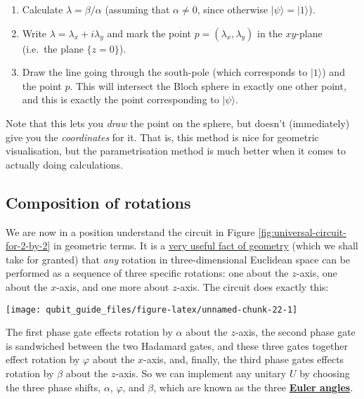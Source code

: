 \documentclass[fleqn]{article}
\providecommand{\tightlist}{%
  \setlength{\itemsep}{0pt}\setlength{\parskip}{0pt}}
\begin{document}
\begin{enumerate}
\def\labelenumi{\arabic{enumi}.}
\tightlist
\item
  Calculate \(\lambda=\beta/\alpha\) (assuming that \(\alpha\neq0\), since otherwise \(|\psi\rangle=|1\rangle\)).
\item
  Write \(\lambda=\lambda_x+i\lambda_y\) and mark the point \(p=(\lambda_x,\lambda_y)\) in the \(xy\)-plane (i.e.~the plane \(\{z=0\}\)).
\item
  Draw the line going through the south-pole (which corresponds to \(|1\rangle\)) and the point \(p\). This will intersect the Bloch sphere in exactly one other point, and this is exactly the point corresponding to \(|\psi\rangle\).
\end{enumerate}

Note that this lets you \emph{draw} the point on the sphere, but doesn't (immediately) give you the \emph{coordinates} for it.
That is, this method is nice for geometric visualisation, but the parametrisation method is much better when it comes to actually doing calculations.

\hypertarget{composition-of-rotations}{%
\subsection{Composition of rotations}\label{composition-of-rotations}}

We are now in a position understand the circuit in Figure \ref{fig:universal-circuit-for-2-by-2} in geometric terms.
It is a \href{https://en.wikipedia.org/wiki/Euler_angles\#Conventions_by_extrinsic_rotations}{very useful fact of geometry} (which we shall take for granted) that \emph{any} rotation in three-dimensional Euclidean space can be performed as a sequence of three specific rotations: one about the \(z\)-axis, one about the \(x\)-axis, and one more about \(z\)-axis.
The circuit does exactly this:

\begin{center}\texttt{[image: qubit\_guide\_files/figure-latex/unnamed-chunk-22-1]} \end{center}

The first phase gate effects rotation by \(\alpha\) about the \(z\)-axis, the second phase gate is sandwiched between the two Hadamard gates, and these three gates together effect rotation by \(\varphi\) about the \(x\)-axis, and, finally, the third phase gates effects rotation by \(\beta\) about the \(z\)-axis.
So we can implement any unitary \(U\) by choosing the three phase shifts, \(\alpha\), \(\varphi\), and \(\beta\), which are known as the three \href{https://en.wikipedia.org/wiki/Euler_angles}{\textbf{Euler angles}}.
\end{document}
